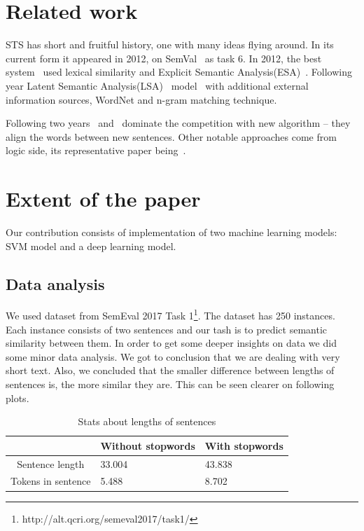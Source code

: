 \documentclass[10pt, a4paper]{article}
\begin{document}
\section{Related work}

STS has short and fruitful history, one with many ideas flying around. In its current form it appeared in 2012, on SemVal~\citep{agirre2012semeval} as task 6.  In 2012, the best system~\citep{bar2012ukp} used lexical similarity and Explicit Semantic Analysis(ESA)~\citep{gabrilovich2007computing}. Following year Latent Semantic Analysis(LSA)~\citep{deerwester1990indexing} model~\citep{han2013umbc} with additional external information sources, WordNet and n-gram matching technique.

Following two years~\citep{sultan2014dls} and~\citep{sultan2015dls} dominate the competition with new algorithm -- they align the words between new sentences. Other notable approaches come from logic side, its representative paper being~\citep{beltagy2014probabilistic}.

\section{Extent of the paper}

Our contribution consists of implementation of two machine learning models: SVM model and a deep learning model.

\subsection{Data analysis}
We used dataset from SemEval 2017
Task 1\footnote{http://alt.qcri.org/semeval2017/task1/}.
The dataset has 250 instances. Each instance consists of two sentences and our tash is to predict semantic similarity between them. In order to get some deeper insights on data we did some minor data analysis. We got to conclusion that we are dealing with very short text. Also, we concluded that the smaller difference between lengths of sentences is, the more similar they are. This can be seen clearer on following plots.

\begin{table}
\caption{Stats about lengths of sentences}
\label{tab:narrow-table}
\begin{center}
\begin{tabular}{cll}
\toprule
& Without stopwords & With stopwords \\
\midrule
Sentence length & 33.004 & 43.838 \\
Tokens in sentence & 5.488 & 8.702 \\
\bottomrule
\end{tabular}
\end{center}
\end{table}
\end{document}
